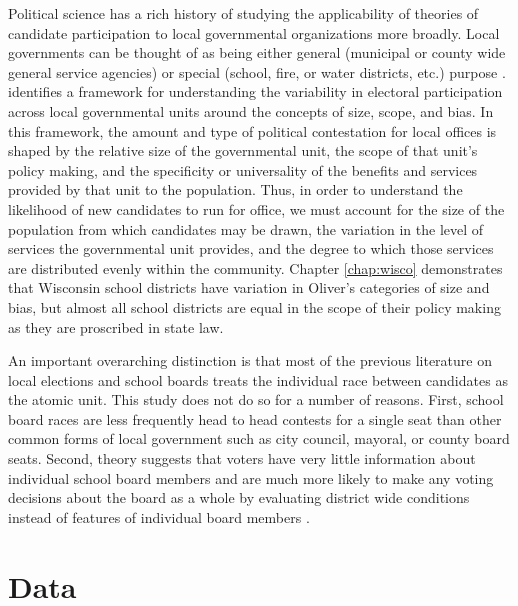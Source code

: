 Political science has a rich history of studying the applicability of theories 
of candidate participation to local governmental organizations more broadly. Local 
governments can be thought of as being either general (municipal or county wide general 
service agencies) or special (school, fire, or water districts, etc.) purpose 
\citep{fosterK}. \citet{oliver} identifies a framework for understanding the 
variability in electoral participation across local governmental units around the 
concepts of size, scope, and bias. In this framework, the amount and type of 
political contestation for local offices is shaped by the relative size of the 
governmental unit, the scope of that unit's policy making, and the specificity or 
universality of the benefits and services provided by that unit to the population. 
Thus, in order to understand the likelihood of new candidates to run for office, 
we must account for the size of the population from which candidates may be drawn, 
the variation in the level of services the governmental unit provides, and the 
degree to which those services are distributed evenly within the community. 
Chapter \ref{chap:wisco} demonstrates that Wisconsin school districts have variation 
in Oliver's categories of size and bias, but almost all school districts are equal 
in the scope of their policy making as they are proscribed in state law. 


An important overarching distinction is that most of the previous literature on 
local elections and school boards treats the individual race between candidates 
as the atomic unit. This study does not do so for a number of reasons. First, 
school board races are less frequently head to head contests for a single seat 
than other common forms of local government such as city council, mayoral, or 
county board seats. Second, theory suggests that voters have very little information 
about individual school board members and are much more likely to make any voting 
decisions about the board as a whole by evaluating district wide conditions instead 
of features of individual board members \citep{oliver}. 

\section{Data}
\label{sec:data}

